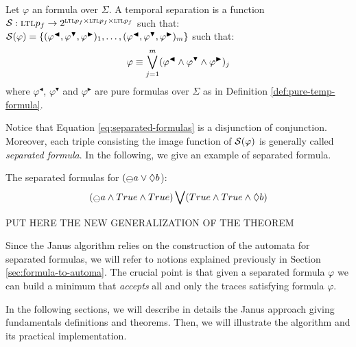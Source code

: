 \begin{definition}\citep{cecconi2018interestingness}\label{def:separated-formula}
Let  $\varphi$ an \LTLp formula over $\Sigma$. A temporal separation is a function $\S: \textsc{ltl}p_f  \rightarrow 2^{\textsc{ltl}p_f \times \textsc{ltl}p_f 	\times \textsc{ltl}p_f}$ such that: $\S(\varphi) = \{(\varphi^{\blacktriangleleft},\varphi^{\blacktriangledown},\varphi^{\blacktriangleright})_1,\dots,\\(\varphi^{\blacktriangleleft},\varphi^{\blacktriangledown},\varphi^{\blacktriangleright})_m\}$ such that:
\begin{equation}\label{eq:separated-formulas}
\varphi \equiv \bigvee^{m}_{j=1} (\varphi^{\blacktriangleleft} \lAND \varphi^{\blacktriangledown} \lAND \varphi^{\blacktriangleright})_j
\end{equation}
where $\varphi^\blacktriangleleft$, $\varphi^\blacktriangledown$ and $\varphi^\blacktriangleright$ are pure formulas over $\Sigma$ as in Definition \ref{def:pure-temp-formula}.
\end{definition}
Notice that Equation \ref{eq:separated-formulas} is a disjunction of conjunction. Moreover, each triple consisting the image function of $\S(\varphi)$ is generally called \emph{separated formula}. In the following, we give an example of separated formula.
\begin{example}\label{ex:separated-formulas}
The separated formulas for $(\Yesterday a \lOR \Diamond b$):
\begin{align*}
(\Yesterday a \lAND True \lAND True)\bigvee(True \lAND True \lAND \Diamond b)
\end{align*}
\end{example}
PUT HERE THE NEW GENERALIZATION OF THE THEOREM

Since the Janus algorithm relies on the construction of the automata for separated \LTLp formulas, we will refer to notions explained previously in Section \ref{sec:formula-to-automa}. The crucial point is that given a separated \LTLp formula $\varphi$ we can build a minimum \DFA that \emph{accepts} all and only the traces satisfying formula $\varphi$.

In the following sections, we will describe in details the Janus approach giving fundamentals definitions and theorems. Then, we will illustrate the algorithm and its practical implementation.
